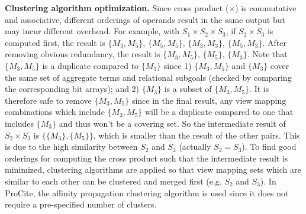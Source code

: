 \begin{example}
\textbf{Clustering algorithm optimization.} Since cross product ($\times$) is commutative and associative, different orderings of operands result in the same output but may incur different overhead. For example, with $S_1\times S_2 \times S_3$, if $S_2 \times S_3$ is computed first, the result is $\{M_3, M_5\}$, $\{M_5, M_5\}$, $\{M_3, M_3\}$, $\{M_5, M_3\}$. After removing obvious redundancy, the result is  $\{M_3, M_5\}$, $\{M_5\}$, $\{M_3\}$. Note that $\{M_3, M_5\}$ is a duplicate compared to $\{M_3\}$ since 1) $\{M_3, M_5\}$ and $\{M_3\}$ cover the same set of aggregate terms and relational subgoals (checked by comparing the corresponding bit arrays); and 2) $\{M_3\}$ is a subset of $\{M_3, M_5\}$. It is therefore safe to remove $\{M_3, M_5\}$ since in the final result, any view mapping combinations which include $\{M_3, M_5\}$ will be a duplicate compared to one that includes $\{M_3\}$ and thus won't be a covering set. So the intermediate result of $S_2 \times S_3$ is $\{\{M_3\}, \{M_5\}\}$, which is smaller than the result of the other pairs. This is due to the high similarity between $S_2$ and $S_3$ (actually $S_2 = S_3$). To find good orderings for computing the cross product such that the intermediate result is minimized, clustering algorithms are applied so that view mapping sets which are similar to each other can be clustered and merged first (e.g. $S_2$ and $S_3$). In ProCite, the affinity propagation clustering algorithm \cite{dueck2007non} is used since it does not require a pre-specified number of clusters.
\end{example}